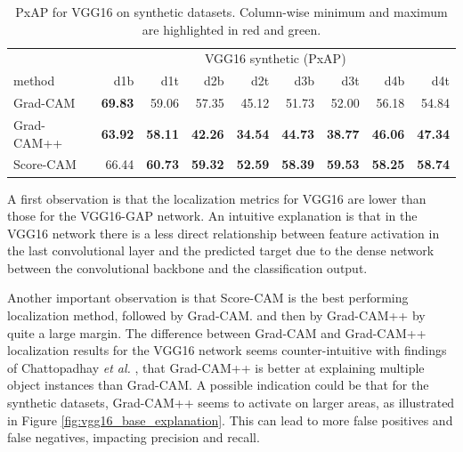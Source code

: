\begin{table}[H]
\centering
\begin{tabular}{lrrrrrrrr}
\toprule
 & \multicolumn{8}{c}{VGG16 synthetic (PxAP)} \\
method & d1b & d1t & d2b & d2t & d3b & d3t & d4b & d4t \\
\cmidrule(lr){1-1} \cmidrule(lr){2-9}
Grad-CAM & \color{teal} \bfseries 69.83 & 59.06 & 57.35 & 45.12 & 51.73 & 52.00 & 56.18 & 54.84 \\
Grad-CAM++ & \color{purple} \bfseries 63.92 & \color{purple} \bfseries 58.11 & \color{purple} \bfseries 42.26 & \color{purple} \bfseries 34.54 & \color{purple} \bfseries 44.73 & \color{purple} \bfseries 38.77 & \color{purple} \bfseries 46.06 & \color{purple} \bfseries 47.34 \\
Score-CAM & 66.44 & \color{teal} \bfseries 60.73 & \color{teal} \bfseries 59.32 & \color{teal} \bfseries 52.59 & \color{teal} \bfseries 58.39 & \color{teal} \bfseries 59.53 & \color{teal} \bfseries 58.25 & \color{teal} \bfseries 58.74 \\
\bottomrule
\end{tabular}
\caption[PxAP for VGG16 on synthetic datasets]{PxAP for VGG16 on synthetic datasets. Column-wise minimum and maximum are highlighted in red and green.}
\label{tab:pxap_vgg16_base_synthetic}
\end{table}

A first observation is that the localization metrics for VGG16 are lower than those for the VGG16-GAP network. An intuitive explanation is that in the VGG16 network there is a less direct relationship between feature activation in the last convolutional layer and the predicted target due to the dense network between the convolutional backbone and the classification output. 

Another important observation is that Score-CAM is the best performing localization method, followed by Grad-CAM. and then by Grad-CAM++ by quite a large margin. The difference between Grad-CAM and Grad-CAM++ localization results for the VGG16 network seems counter-intuitive with findings of Chattopadhay \textit{et al.} \cite{chattopadhay2018grad}, that Grad-CAM++ is better at explaining multiple object instances than Grad-CAM. A possible indication could be that for the synthetic datasets, Grad-CAM++ seems to activate on larger areas, as illustrated in Figure \ref{fig:vgg16_base_explanation}. This can lead to more false positives and false negatives, impacting precision and recall.

